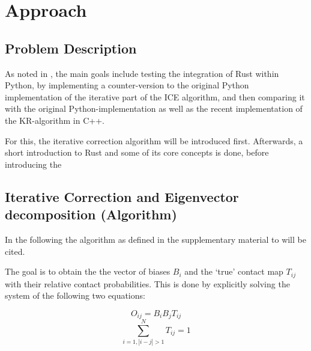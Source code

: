 \chapter{Approach}\label{chap:approach}



\section{Problem Description}\label{sec:problem}



As noted in , the main goals include testing the integration
of Rust within Python, by implementing a counter-version to the original Python
implementation of the iterative part of the ICE algorithm, and then comparing
it with the original Python-implementation as well as the recent implementation
of the KR-algorithm in C++.

For this, the iterative correction algorithm will be introduced first.
Afterwards, a short introduction to Rust and some of its core concepts is done,
before introducing the





\section{Iterative Correction and Eigenvector decomposition (Algorithm)}\label{sec:ICE}

In the following the algorithm as defined in the supplementary material to
\cite{imakaev2012iterative} will be cited.

The goal is to obtain the the vector of biases $B_i$ and the `true' contact map
$T_{ij}$ with their relative contact probabilities. This is done by explicitly
solving the system of the following two equations:

\begin{equation} \label{eq:1}
O_{ij} = B_i B_j T_{ij}
\end{equation}
\begin{equation} \label{eq:2}
\sum^N_{i=1, |i-j|>1} T_{ij} = 1
\end{equation}

